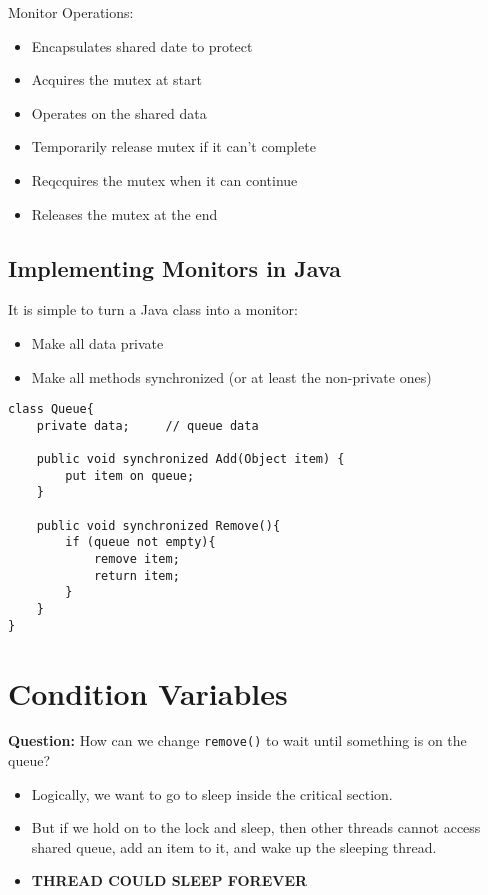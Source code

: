 Monitor Operations:
\begin{itemize}
    \item Encapsulates shared date to protect
    \item Acquires the mutex at start
    \item Operates on the shared data
    \item Temporarily release mutex if it can't complete
    \item Reqcquires the mutex when it can continue
    \item Releases the mutex at the end
\end{itemize}

\subsection{Implementing Monitors in Java}

It is simple to turn a Java class into a monitor:

\begin{itemize}
    \item Make all data private
    \item Make all methods synchronized (or at least the non-private ones)
\end{itemize}

\begin{verbatim}
class Queue{
    private data;     // queue data

    public void synchronized Add(Object item) {
        put item on queue;
    }

    public void synchronized Remove(){
        if (queue not empty){
            remove item;
            return item;
        }
    }
}
\end{verbatim}

\section{Condition Variables}
\textbf{Question:} How can we change \texttt{remove()} to wait until something
is on the queue?
\begin{itemize}
    \item Logically, we want to go to sleep inside the critical section.
    \item But if we hold on to the lock and sleep, then other threads cannot
        access shared queue, add an item to it, and wake up the sleeping thread.
    \item \textbf{THREAD COULD SLEEP FOREVER}
\end{itemize}


